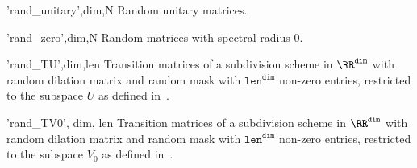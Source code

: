 \begin{param}
\item['rand\_unitary',dim,N] Random unitary matrices.
\item['rand\_zero',dim,N] Random matrices with spectral radius 0.
\item['rand\_TU',dim,len] Transition matrices of a subdivision scheme in $\RR^\texttt{dim}$ with random dilation matrix and random mask with $\texttt{len}^\texttt{dim}$ non-zero entries, restricted to the subspace $U$ as defined in~\cite{CP17}.
\item['rand\_TV0', dim, len] Transition matrices of a subdivision scheme in $\RR^\texttt{dim}$ with random dilation matrix and random mask with $\texttt{len}^\texttt{dim}$ non-zero entries, restricted to the subspace $V_0$ as defined in~\cite{CM18}.

\end{param}


